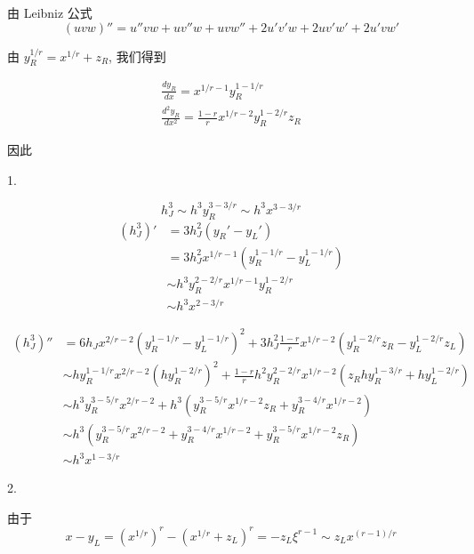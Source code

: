 \documentclass{ctexart}
\begin{document}
由 Leibniz 公式 
\begin{equation}
    (uvw)'' = u''vw + uv''w + uvw'' + 2u'v'w + 2uv'w' + 2u'vw'
\end{equation} 

由 \(y_R^{1/r} = x^{1/r} + z_R\), 我们得到

\begin{gather}
    \frac{d y_R}{dx} = x^{1/r-1} y_R^{1-1/r}    \\
    \frac{d^2 y_R}{dx^2} = \frac{1-r}{r} x^{1/r-2} y_R^{1-2/r}z_R   
\end{gather}

因此

1. 

\begin{equation}
    h_J^3 \sim h^3 y_R^{3-3/r} \sim h^3 x^{3-3/r}
\end{equation}
\begin{equation}
    \begin{aligned}
        (h_J^3)' &= 3 h_J^2 (y_R' - y_L ') \\
        &= 3 h_J^2 x^{1/r-1}(y_R^{1-1/r} - y_L^{1-1/r}) \\
        & \sim h^3 y_R^{2-2/r} x^{1/r-1} y_R^{1-2/r}    \\
        &\sim h^3 x^{2-3/r}
    \end{aligned}
\end{equation}


\begin{equation}
    \begin{aligned}
        (h_J^3)'' &= 6 h_J x^{2/r-2}(y_R^{1-1/r}-y_L^{1-1/r})^2 + 3 h_J^2 \frac{1-r}{r} x^{1/r-2}(y_R^{1-2/r}z_R-y_L^{1-2/r}z_L)    \\
        &\sim h y_R^{1-1/r} x^{2/r-2} (hy_R^{1-2/r})^2 + \frac{1-r}{r} h^2 y_R^{2-2/r} x^{1/r-2}(z_R h y_R^{1-3/r} + hy_L^{1-2/r})    \\
        &\sim h^3 y_R^{3-5/r} x^{2/r-2} + h^3 (y_R^{3-5/r}x^{1/r-2}z_R + y_R^{3-4/r} x^{1/r-2})  \\
        &\sim h^3 ( y_R^{3-5/r} x^{2/r-2} + y_R^{3-4/r} x^{1/r-2} + y_R^{3-5/r}x^{1/r-2}z_R)    \\
        & \sim  h^3 x^{1-3/r}
    \end{aligned}
\end{equation}


2.

由于
\begin{equation}
    x-y_L = (x^{1/r})^{r} - (x^{1/r} + z_L)^r = -z_L \xi^{r-1} \sim z_L x^{(r-1)/r}
\end{equation}
\end{document}
